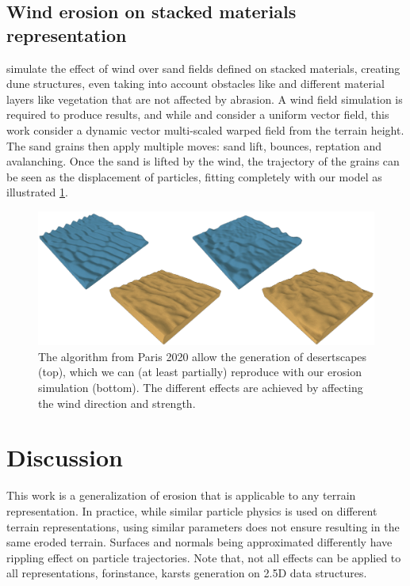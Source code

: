 \subsection{Wind erosion on stacked materials representation}
\citep{Paris2020} simulate the effect of wind over sand fields defined on stacked materials, creating dune structures, even taking into account obstacles like \cite{Roa2004} and different material layers like vegetation \cite{Cordonnier2017a} that are not affected by abrasion\cite{Paris2020}. A wind field simulation is required to produce results, and while \cite{Roa2004} and \cite{Onoue2000} consider a uniform vector field, this work consider a dynamic vector multi-scaled warped field from the terrain height. The sand grains then apply multiple moves: sand lift, bounces, reptation and avalanching. Once the sand is lifted by the wind, the trajectory of the grains can be seen as the displacement of particles, fitting completely with our model as illustrated \cref{fig:erosion_screen-paris2020}.
\begin{figure}[ht!]
\centering
\includegraphics{otherPapersRepro/desert.pdf}
\caption{The algorithm from Paris 2020 allow the generation of desertscapes (top), which we can (at least partially) reproduce with our erosion simulation (bottom). The different effects are achieved by affecting the wind direction and strength. }
\label{fig:erosion_screen-paris2020}
\end{figure}

\section{Discussion}
This work is a generalization of erosion that is applicable to any terrain representation. In practice, while similar particle physics is used on different terrain representations, using similar parameters does not ensure resulting in the same eroded terrain. Surfaces and normals being approximated differently have rippling effect on particle trajectories. 
Note that, not all effects can be applied to all representations, forinstance, karsts generation on 2.5D data structures. 

